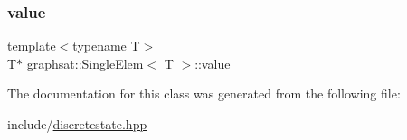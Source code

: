 \subsubsection{\texorpdfstring{value}{value}}
{\footnotesize\ttfamily template$<$typename T$>$ \\
T$\ast$ \mbox{\hyperlink{classgraphsat_1_1_single_elem}{graphsat\+::\+Single\+Elem}}$<$ T $>$\+::value\hspace{0.3cm}{\ttfamily [private]}}



The documentation for this class was generated from the following file\+:\begin{DoxyCompactItemize}
\item 
include/\mbox{\hyperlink{discretestate_8hpp}{discretestate.\+hpp}}\end{DoxyCompactItemize}
